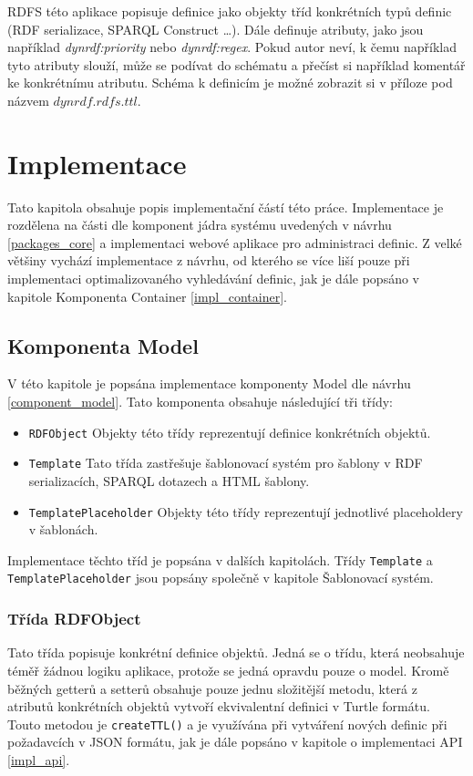 \documentclass[thesis=B,czech]{FITthesis}[2012/06/26]
\begin{document}
  RDFS této aplikace popisuje definice jako objekty tříd konkrétních typů definic (RDF serializace, SPARQL Construct \ldots). Dále definuje atributy, jako jsou
  například \textit{dynrdf:priority} nebo \textit{dynrdf:regex}. Pokud autor neví, k čemu například tyto atributy slouží, může se podívat 
  do schématu a přečíst si například komentář ke konkrétnímu atributu. Schéma k definicím je možné zobrazit si v příloze pod názvem $dynrdf.rdfs.ttl$.
  
  
  
  \chapter{Implementace}
  Tato kapitola obsahuje popis implementační částí této práce. Implementace je rozdělena na části dle komponent jádra systému uvedených v návrhu \ref{packages_core}
  a implementaci webové aplikace pro administraci definic. Z velké většiny vychází implementace z návrhu, od kterého se více liší pouze při implementaci 
  optimalizovaného vyhledávání definic, jak je dále popsáno v kapitole Komponenta Container \ref{impl_container}.
  
  
  \section{Komponenta Model}
  V této kapitole je popsána implementace komponenty Model dle návrhu \ref{component_model}. 
  Tato komponenta obsahuje následující tři třídy:
  
  \begin{itemize}
   \item \texttt{RDFObject}
      \subitem Objekty této třídy reprezentují definice konkrétních objektů.   
   \item \texttt{Template}
      \subitem Tato třída zastřešuje šablonovací systém pro šablony v RDF serializacích, SPARQL dotazech a HTML šablony.
   \item \texttt{TemplatePlaceholder}
      \subitem Objekty této třídy reprezentují jednotlivé placeholdery v šablonách.
  \end{itemize}
  Implementace těchto tříd je popsána v dalších kapitolách. Třídy \texttt{Template} a \texttt{TemplatePlaceholder} jsou popsány společně v kapitole
  Šablonovací systém.
  
  \subsection{Třída RDFObject}
  Tato třída popisuje konkrétní definice objektů. Jedná se o třídu, která neobsahuje téměř žádnou logiku aplikace, protože se jedná opravdu pouze o model.
  Kromě běžných getterů a setterů obsahuje pouze jednu složitější metodu, která z atributů konkrétních objektů vytvoří ekvivalentní definici v Turtle formátu.
  Touto metodou je \texttt{createTTL()} a je využívána při vytváření nových definic při požadavcích v JSON formátu, jak je dále popsáno v kapitole o implementaci
  API \ref{impl_api}.
  
\end{document}
